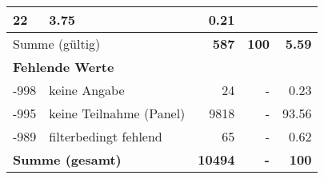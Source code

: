 \begin{longtable}{lXrrr}
       \num{22} &
       \num[round-mode=places,round-precision=2]{3,75} &
         \num[round-mode=places,round-precision=2]{0,21} \\
     \midrule
     \multicolumn{2}{l}{Summe (gültig)} &
       \textbf{\num{587}} &
     \textbf{100} &
       \textbf{\num[round-mode=places,round-precision=2]{5,59}} \\
     \multicolumn{5}{l}{\textbf{Fehlende Werte}}\\
       -998 &
       keine Angabe &
         \num{24} &
        - &
         \num[round-mode=places,round-precision=2]{0,23} \\
       -995 &
       keine Teilnahme (Panel) &
         \num{9818} &
        - &
         \num[round-mode=places,round-precision=2]{93,56} \\
       -989 &
       filterbedingt fehlend &
         \num{65} &
        - &
         \num[round-mode=places,round-precision=2]{0,62} \\
     \midrule
     \multicolumn{2}{l}{\textbf{Summe (gesamt)}} &
          \textbf{\num{10494}} &
        \textbf{-} &
        \textbf{100} \\
     \bottomrule
     \end{longtable}
     
